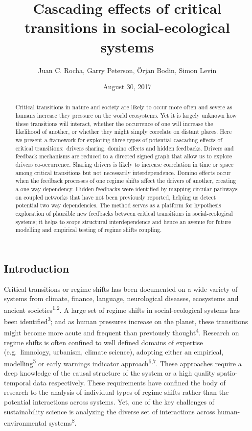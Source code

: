 \documentclass[9pt,]{article}
\title{Cascading effects of critical transitions in social-ecological systems}
\author{Juan C. Rocha, Garry Peterson, Örjan Bodin, Simon Levin}
\date{August 30, 2017}
\begin{document}
\maketitle
\begin{abstract}
Critical transitions in nature and society are likely to occur more
often and severe as humans increase they pressure on the world
ecosystems. Yet it is largely unknown how these transitions will
interact, whether the occurrence of one will increase the likelihood of
another, or whether they might simply correlate on distant places. Here
we present a framework for exploring three types of potential cascading
effects of critical transitions\(:\) drivers sharing, domino effects and
hidden feedbacks. Drivers and feedback mechanisms are reduced to a
directed signed graph that allow us to explore drivers co-occurrence.
Sharing drivers is likely to increase correlation in time or space among
critical transitions but not necessarily interdependence. Domino effects
occur when the feedback processes of one regime shifts affect the
drivers of another, creating a one way dependency. Hidden feedbacks were
identified by mapping circular pathways on coupled networks that have
not been previously reported, helping us detect potential two way
dependencies. The method serves as a platform for hypothesis exploration
of plausible new feedbacks between critical transitions in
social-ecological systems; it helps to scope structural interdependence
and hence an avenue for future modelling and empirical testing of regime
shifts coupling.
\end{abstract}

\subsection{Introduction}\label{introduction}

Critical transitions or regime shifts has been documented on a wide
variety of systems from climate, finance, language, neurological
diseases, ecosystems and ancient societies\textsuperscript{1,2}. A large
set of regime shifts in social-ecological systems has been
identified\textsuperscript{3}; and as human pressures increase on the
planet, these transitions might become more acute and frequent than
previously thought\textsuperscript{4}. Research on regime shifts is
often confined to well defined domains of expertise (e.g.~limnology,
urbanism, climate science), adopting either an empirical,
modelling\textsuperscript{5} or early warnings indicator
approach\textsuperscript{6,7}. These approaches require a deep knowledge
of the causal structure of the system or a high quality spatio-temporal
data respectively. These requirements have confined the body of research
to the analysis of individual types of regime shifts rather than the
potential interactions across systems. Yet, one of the key challenges of
sustainability science is analyzing the diverse set of interactions
across human-environmental systems\textsuperscript{8}.
\end{document}

